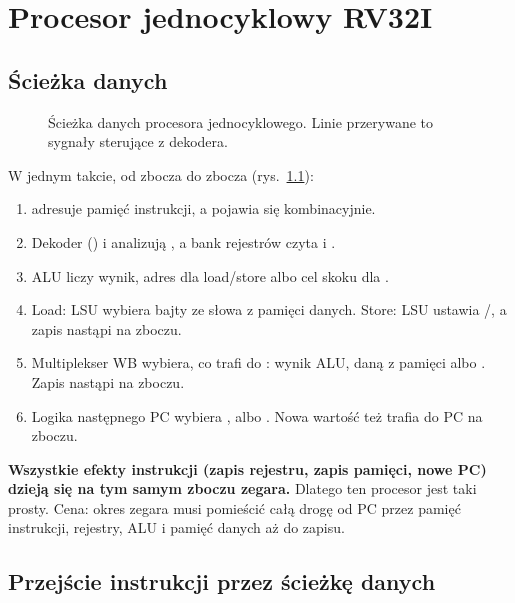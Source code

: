 \chapter{Procesor jednocyklowy RV32I}
\label{ch:single}


\section{Ścieżka danych}

\begin{figure}[h]
\centering
\resizebox{\linewidth}{!}{}
\caption{Ścieżka danych procesora jednocyklowego. Linie przerywane to sygnały
sterujące z dekodera.}
\label{fig:datapath}
\end{figure}

W jednym takcie, od zbocza do zbocza (rys.~\ref{fig:datapath}):
\begin{enumerate}
  \item {} adresuje pamięć instrukcji, a  pojawia się kombinacyjnie.
  \item Dekoder () i  analizują , a bank
    rejestrów czyta  i .
  \item ALU liczy wynik, adres dla load/store albo cel skoku dla .
  \item Load: LSU wybiera bajty ze słowa z pamięci danych. Store: LSU ustawia
    /, a zapis nastąpi na zboczu.
  \item Multiplekser WB wybiera, co trafi do : wynik ALU, daną z
    pamięci albo . Zapis nastąpi na zboczu.
  \item Logika następnego PC wybiera ,  albo
    . Nowa wartość też trafia do PC na zboczu.
\end{enumerate}

\textbf{Wszystkie efekty instrukcji (zapis rejestru, zapis pamięci, nowe PC)
dzieją się na tym samym zboczu zegara.} Dlatego ten procesor jest taki prosty.
Cena: okres zegara musi pomieścić całą drogę od PC przez pamięć instrukcji,
rejestry, ALU i pamięć danych aż do zapisu.

\section{Przejście instrukcji przez ścieżkę danych}

